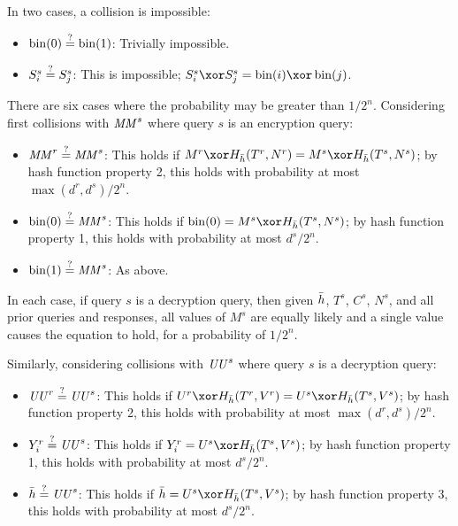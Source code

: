 \documentclass[hctr2.tex]{subfiles}
\begin{document}
In two cases, a collision is impossible:

\begin{itemize}
    \item \(\operatorname{bin}(0) \stackrel{\text{?}}{=} \operatorname{bin}(1)\): 
    Trivially impossible.
    \item 
    \(S_i^s \stackrel{\text{?}}{=} S_j^s\):
    This is impossible; 
    \(S_i^s \xor S_j^s = \fromint(i) \xor \fromint(j)\).
\end{itemize}

There are six cases where the probability may
be greater than \(1/2^n\).
Considering first collisions with \(\mathit{MM}^s\) where
query \(s\) is an encryption query:

\begin{itemize}
    \item \(\mathit{MM}^r \stackrel{\text{?}}{=} \mathit{MM}^s\):
    This holds if \(M^r \xor H_{\hgen}(T^r, N^r) = M^s \xor H_{\hgen}(T^s, N^s)\);
    by hash function property 2, this holds with probability at most
    \(\max(d^r, d^s)/2^n\).
    \item \(\operatorname{bin}(0) \stackrel{\text{?}}{=} \mathit{MM}^s\):
    This holds if \(\fromint(0) = M^s \xor H_{\hgen}(T^s, N^s)\);
    by hash function property 1, this holds with probability at most
    \(d^s/2^n\).
    \item \(\operatorname{bin}(1) \stackrel{\text{?}}{=} \mathit{MM}^s\):
    As above.
\end{itemize}

In each case, if query \(s\) is a decryption query,
then given \(\bar{h}\), \(T^s\), \(C^s\), \(N^s\),
and all prior queries and responses,
all values of \(M^s\) are equally likely 
and a single value causes the equation to hold,
for a probability of \(1/2^n\).

Similarly, considering collisions with \(\mathit{UU}^s\) where
query \(s\) is a decryption query:

\begin{itemize}
    \item \(\mathit{UU}^r \stackrel{\text{?}}{=} \mathit{UU}^s\): 
    This holds if \(U^r \xor H_{\hgen}(T^r, V^r) = U^s \xor H_{\hgen}(T^s, V^s)\);
    by hash function property 2, this holds with probability at most
    \(\max(d^r, d^s)/2^n\).
    \item \(Y_i^r \stackrel{\text{?}}{=} \mathit{UU}^s\):
    This holds if \(Y_i^r = U^s \xor H_{\hgen}(T^s, V^s)\);
    by hash function property 1, this holds with probability at most
    \(d^s/2^n\).
    \item \(\bar{h} \stackrel{\text{?}}{=} \mathit{UU}^s\):
    This holds if \(\hgen = U^s \xor H_{\hgen}(T^s, V^s)\);
    by hash function property 3, this holds with probability at most
    \(d^s/2^n\).
\end{itemize}
\end{document}

